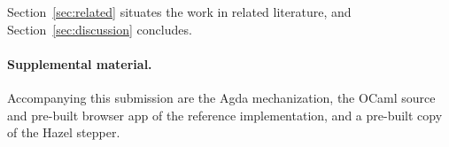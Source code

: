 Section~\ref{sec:related} situates the work in related literature, and
Section~\ref{sec:discussion} concludes.

\paragraph*{Supplemental material.}
Accompanying this submission are the Agda mechanization, the OCaml
source and pre-built browser app of the reference implementation, and a
pre-built copy of the Hazel stepper.

